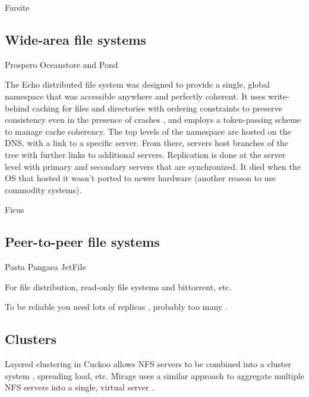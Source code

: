 Farsite \cite{bolosky,adya}\cite{douceur01}\cite{douceur02}

\subsection{Wide-area file systems}

Prospero \cite{neuman}
Oceanstore and Pond \cite{kubiatowicz,rhea}

The Echo distributed file system \cite{birrell93} was designed to provide a single, global namespace that was accessible anywhere and perfectly coherent. It uses write-behind caching for files and directories with ordering constraints to preserve consistency even in the presence of crashes \cite{mann}, and employs a token-passing scheme to manage cache coherency. The top levels of the namespace are hosted on the DNS, with a link to a specific server. From there, servers host branches of the tree with further links to additional servers. Replication is done at the server level with primary and secondary servers that are synchronized. It died when the OS that hosted it wasn't ported to newer hardware (another reason to use commodity systems).

Ficus \cite{popek}

\subsection{Peer-to-peer file systems}

Pasta \cite{moreton}
Pangaea \cite{saito02}
\cite{stein02}
JetFile \cite{gronvall}

For file distribution, read-only file systems \cite{fu} and bittorrent, etc.

To be reliable you need lots of replicas \cite{rabin}, probably too many \cite{blake}.

\cite{kim}\cite{mummert}\cite{sobti}

\subsection{Clusters}

\cite{amiri}

Layered clustering in Cuckoo allows NFS servers to be combined into a cluster system \cite{klosterman}, spreading load, etc. Mirage uses a similar approach to aggregate multiple NFS servers into a single, virtual server \cite{baker02}.

